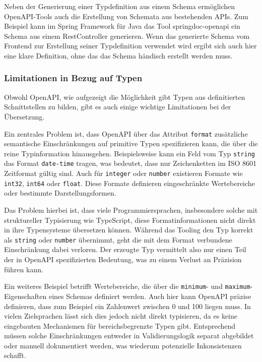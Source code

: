Neben der Generierung einer Typdefinition aus einem Schema ermöglichen OpenAPI-Tools auch die Erstellung von
Schemata aus bestehenden APIs.
Zum Beispiel kann im Spring Framework für Java das Tool springdoc-openapi ein Schema aus einem 
RestController generieren.
Wenn das generierte Schema vom Frontend zur Erstellung seiner Typdefinition verwendet wird ergibt sich auch
hier eine klare Definition, ohne das das Schema händisch erstellt werden muss.

\subsubsection{Limitationen in Bezug auf Typen}

Obwohl OpenAPI, wie aufgezeigt die Möglichkeit gibt Typen aus definitierten Schnittstellen zu bilden, 
gibt es auch einige wichtige Limitationen bei der Übersetzung.

Ein zentrales Problem ist, dass OpenAPI über das Attribut \texttt{format} zusätzliche semantische Einschränkungen
auf primitive Typen spezifizieren kann, die über die reine Typinformation hinausgehen.
Beispielsweise kann ein Feld vom Typ \texttt{string} das Format \texttt{date-time} tragen, 
was bedeutet, dass nur Zeichenketten im ISO 8601 Zeitformat gültig sind. 
Auch für \texttt{integer} oder \texttt{number} existieren Formate wie 
\texttt{int32}, \texttt{int64} oder \texttt{float}. 
Diese Formate definieren eingeschränkte Wertebereiche oder bestimmte Darstellungsformen.

Das Problem hierbei ist, dass viele Programmiersprachen, insbesondere solche mit struktureller Typisierung wie TypeScript,
diese Formatinformationen nicht direkt in ihre Typensysteme übersetzen können. 
Während das Tooling den Typ korrekt als \texttt{string} oder \texttt{number} übernimmt, 
geht die mit dem Format verbundene Einschränkung dabei verloren. 
Der erzeugte Typ vermittelt also nur einen Teil der in OpenAPI spezifizierten Bedeutung, 
was zu einem Verlust an Präzision führen kann.

Ein weiteres Beispiel betrifft Wertebereiche, 
die über die \texttt{minimum}- und \texttt{maximum}-Eigenschaften eines Schemas definiert werden.
Auch hier kann OpenAPI präzise definieren, dass zum Beispiel ein Zahlenwert zwischen 0 und 100 liegen muss. 
In vielen Zielsprachen lässt sich dies jedoch nicht direkt typisieren, 
da es keine eingebauten Mechanismen für bereichsbegrenzte Typen gibt.
Entsprechend müssen solche Einschränkungen entweder in Validierungslogik separat abgebildet oder manuell dokumentiert werden,
was wiederum potenzielle Inkonsistenzen schafft.

